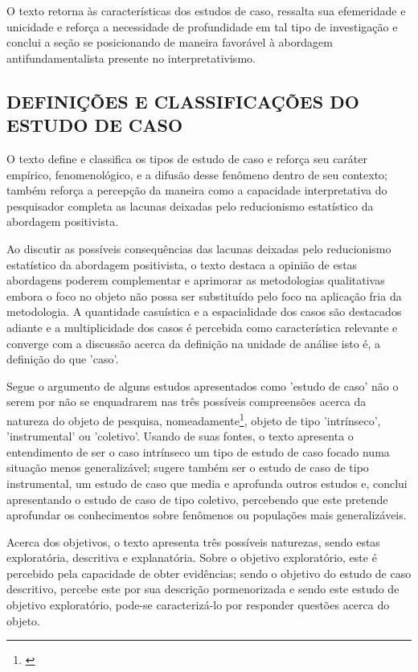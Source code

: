 \documentclass[
   article,       %
   12pt,          %
   oneside,       %
   a4paper,       %
   english,       %
   brazil,           %
   sumario=tradicional
   ]{abntex2}
\begin{document}
O texto retorna às características dos estudos de caso, ressalta sua efemeridade e unicidade e reforça a necessidade de profundidade em tal tipo de investigação e conclui a seção se posicionando de maneira favorável à abordagem antifundamentalista presente no interpretativismo.


\subsection{DEFINIÇÕES E CLASSIFICAÇÕES DO ESTUDO DE CASO}

O texto define e classifica os tipos de estudo de caso e reforça seu caráter empírico, fenomenológico, e a difusão desse fenômeno dentro de seu contexto; também reforça a percepção da maneira como a capacidade interpretativa do pesquisador completa as lacunas deixadas pelo reducionismo estatístico da abordagem positivista.

Ao discutir as possíveis consequências das lacunas deixadas pelo reducionismo estatístico da abordagem positivista, o texto destaca a opinião de estas abordagens poderem complementar e aprimorar as metodologias qualitativas embora o foco no objeto não possa ser substituído pelo foco na aplicação fria da metodologia. A quantidade casuística e a espacialidade dos casos são destacados adiante e a multiplicidade dos casos é percebida como característica relevante e converge com a discussão acerca da definição na unidade de análise isto é, a definição do que 'caso'.

Segue o argumento de alguns estudos apresentados como 'estudo de caso' não o serem por não se enquadrarem nas três possíveis compreensões acerca da natureza do objeto de pesquisa, nomeadamente\footnote{\cite[p.177]{cap_6_ontologia}}, objeto de tipo 'intrínseco', 'instrumental' ou 'coletivo'. Usando de suas fontes, o texto apresenta o entendimento de ser o caso intrínseco um tipo de estudo de caso focado numa situação menos generalizável; sugere também ser o estudo de caso de tipo instrumental, um estudo de caso que media e aprofunda outros estudos e, conclui apresentando o estudo de caso de tipo coletivo, percebendo que este pretende aprofundar os conhecimentos sobre fenômenos ou populações mais generalizáveis.

Acerca dos objetivos, o texto apresenta três possíveis naturezas, sendo estas exploratória, descritiva e explanatória. Sobre o objetivo exploratório, este é percebido pela capacidade de obter evidências; sendo o objetivo do estudo de caso descritivo, percebe este por sua descrição pormenorizada e sendo este estudo de objetivo exploratório, pode-se caracterizá-lo por responder questões acerca do objeto.
\end{document}
